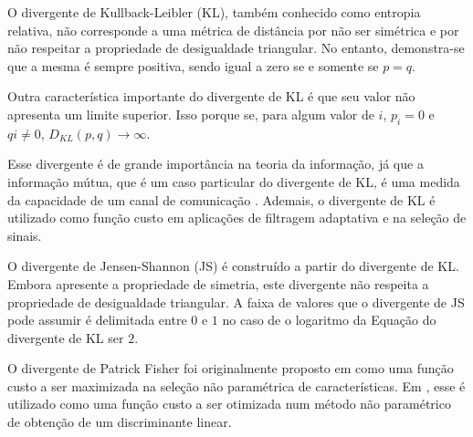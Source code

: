 

O divergente de Kullback-Leibler (KL), também conhecido como entropia relativa, não corresponde a uma métrica de distância por não ser simétrica e por não respeitar a propriedade de desigualdade triangular. No entanto, demonstra-se que a mesma é sempre positiva, sendo igual a zero se e somente se $p = q$.

Outra característica importante do divergente de KL é que seu valor não apresenta um limite superior. Isso porque se, para algum valor de $i$, $p_{i} = 0$ e $q{i} \neq 0$, $D_{KL}(p,q) \to \infty$.

Esse divergente é de grande importância na teoria da informação, já que a informação mútua, que é um caso particular do divergente de KL, é uma medida da capacidade de um canal de comunicação \cite{Thomas:2006}. Ademais, o divergente de KL é utilizado como função custo em aplicações de filtragem adaptativa e na seleção de sinais.  


O divergente de Jensen-Shannon (JS) é construído a partir do divergente de KL. Embora apresente a propriedade de simetria, este divergente não respeita a propriedade de desigualdade triangular. A faixa de valores que o divergente de JS  pode assumir é delimitada entre $0$ e $1$ no caso de o logaritmo da Equação do divergente de KL ser $2$.
 
\begin{comment}
$D_{JS}(p,q) =\frac{1}{2}(D_{KL}(p,h)+D_{KL}(q,h))$, sendo $h = \frac{p+q}{2}$
\end{comment}


O divergente de Patrick Fisher foi originalmente proposto em  como uma função custo a ser maximizada na seleção não paramétrica de características. Em \cite{662771}, esse é utilizado como uma função custo a ser otimizada num método não paramétrico de obtenção de um discriminante linear.  

